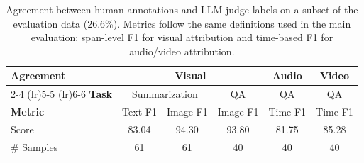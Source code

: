 \begin{table}[ht]
\centering
\tablesize
\caption{Agreement between human annotations and LLM-judge labels on a subset of the evaluation data (26.6\%). Metrics follow the same definitions used in the main evaluation: span-level F1 for visual attribution and time-based F1 for audio/video attribution.}
\label{tab:human_llm_agreement}
\skiptablebegin
\begin{tabular}{lccccc}
\toprule
\textbf{Agreement} & \multicolumn{3}{c}{\textbf{Visual}} & \textbf{Audio} & \textbf{Video} \\
\cmidrule(lr){2-4} \cmidrule(lr){5-5} \cmidrule(lr){6-6}
\textbf{Task} & \multicolumn{2}{c}{Summarization} & QA & QA & QA \\
\textbf{Metric} & Text F1 & Image F1 & Image F1 & Time F1 & Time F1 \\
\midrule
Score & 83.04 & 94.30 & 93.80 & 81.75 & 85.28 \\
\# Samples & 61 & 61 & 40 & 40 & 40 \\
\bottomrule
\end{tabular}
\skiptableend
\end{table}